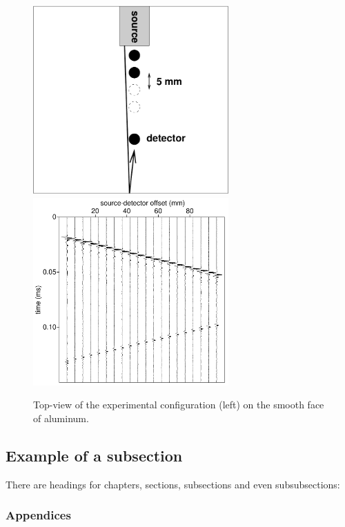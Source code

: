 \begin{figure}
  \center
  \includegraphics[width=7.5cm]{figures/setup}
  \includegraphics[width=7.5cm]{figures/exp0}
  \caption{Top-view of the experimental configuration (left) on the
    smooth face of aluminum.}
  \label{fig:figure}
\end{figure}

\subsection{Example of a subsection}
There are headings for chapters, sections, subsections and even
subsubsections:

\subsubsection{Appendices}

